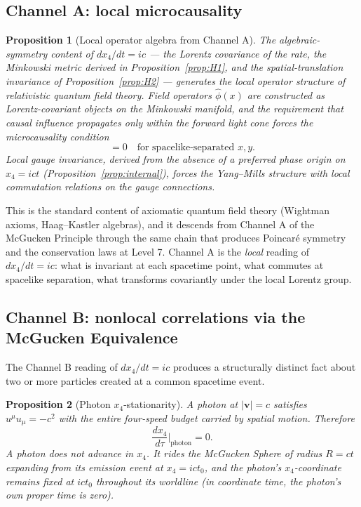 \documentclass[11pt,a4paper]{article}
\newtheorem{proposition}{Proposition}
\begin{document}
\subsection{Channel A: local microcausality}

\begin{proposition}[Local operator algebra from Channel A]
\label{prop:microcausality}
The algebraic-symmetry content of $dx_4/dt = ic$ --- the Lorentz covariance of the rate, the Minkowski metric derived in Proposition~\ref{prop:H1}, and the spatial-translation invariance of Proposition~\ref{prop:H2} --- generates the local operator structure of relativistic quantum field theory. Field operators $\hat\phi(x)$ are constructed as Lorentz-covariant objects on the Minkowski manifold, and the requirement that causal influence propagates only within the forward light cone forces the microcausality condition
\begin{equation}
[\hat\phi(x), \hat\phi(y)] = 0 \quad \text{for spacelike-separated } x, y.
\end{equation}
Local gauge invariance, derived from the absence of a preferred phase origin on $x_4 = ict$ (Proposition~\ref{prop:internal}), forces the Yang--Mills structure with local commutation relations on the gauge connections.
\end{proposition}

This is the standard content of axiomatic quantum field theory (Wightman axioms, Haag--Kastler algebras), and it descends from Channel A of the McGucken Principle through the same chain that produces Poincar\'e symmetry and the conservation laws at Level 7. Channel A is the \emph{local} reading of $dx_4/dt = ic$: what is invariant at each spacetime point, what commutes at spacelike separation, what transforms covariantly under the local Lorentz group.

\subsection{Channel B: nonlocal correlations via the McGucken Equivalence}

The Channel B reading of $dx_4/dt = ic$ produces a structurally distinct fact about two or more particles created at a common spacetime event.

\begin{proposition}[Photon $x_4$-stationarity]
\label{prop:photonx4}
A photon at $|\mathbf{v}| = c$ satisfies $u^\mu u_\mu = -c^2$ with the entire four-speed budget carried by spatial motion. Therefore
\begin{equation}
\frac{dx_4}{d\tau}\Big|_{\text{photon}} = 0.
\end{equation}
A photon does not advance in $x_4$. It rides the McGucken Sphere of radius $R = ct$ expanding from its emission event at $x_4 = ict_0$, and the photon's $x_4$-coordinate remains fixed at $ict_0$ throughout its worldline (in coordinate time, the photon's own proper time is zero).
\end{proposition}
\end{document}
